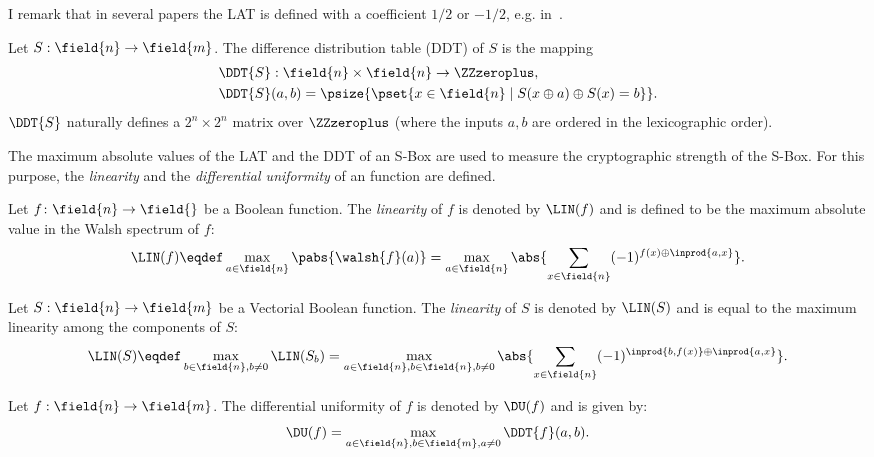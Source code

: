 I remark that in several papers the LAT is defined with a coefficient $1/2$ or $-1/2$, e.g. in~\cite{OurFeistel}. 

\begin{definition}
Let $S: \field{n} \to \field{m}$. The difference distribution table (DDT) of $S$ is the mapping
\begin{align*}
& \DDT{S}: \field{n}\times\field{n} \to \ZZzeroplus, \\
& \DDT{S}(a,b) =
\psize{\pset{x \in \field{n} \mid S(x\oplus a) \oplus S(x) = b }}
.    
\end{align*}
$\DDT{S}$ naturally defines a $2^n \times 2^n$ matrix over $\ZZzeroplus$ (where the inputs $a,b$ are ordered in the lexicographic order).
\end{definition}

The maximum absolute values of the LAT and the DDT of an S-Box are used to measure the cryptographic strength of the S-Box. For this purpose, the \emph{linearity} and the \emph{differential uniformity} of an function are defined.

\begin{definition}[Linearity]
Let $f\colon \field{n} \to \field{}$ be a Boolean function. The \emph{linearity} of $f$ is denoted by $\LIN(f)$ and is defined to be the maximum absolute value in the Walsh spectrum of $f$:
$$
\LIN(f) \eqdef \max_{a \in \field{n}} \pabs{\walsh{f}(a)}
= \max_{a \in \field{n}} \abs{\sum_{x \in \field{n}}(-1)^{f(x) \oplus \inprod{a,x}}}
.$$

Let $S: \field{n} \to \field{m}$ be a Vectorial Boolean function. The \emph{linearity} of $S$ is denoted by $\LIN(S)$ and is equal to the maximum linearity among the components of $S$:
$$
\LIN(S) \eqdef \max_{b \in \field{n}, b \ne 0} \LIN(S_b)
= \max_{a \in \field{n},b\in \field{n},b\ne 0} \abs{\sum_{x \in \field{n}} (-1)^{\inprod{b,f(x)} \oplus \inprod{a,x}}}
.
$$
\end{definition}



\begin{definition}
Let $f: \field{n} \to \field{m}$. The differential uniformity of $f$ is denoted by $\DU(f)$ and is given by:
$$
\DU(f) = \max_{a\in \field{n}, b\in \field{m}, a\ne 0} \DDT{f}(a,b).
$$
\end{definition}

